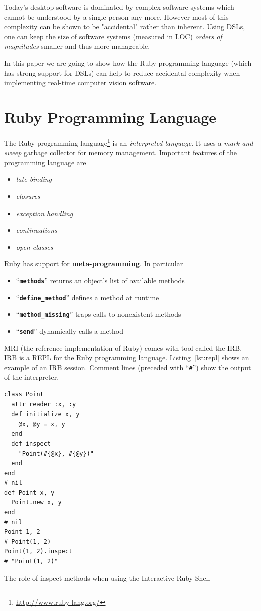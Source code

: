\documentclass[10pt,journal,compsoc]{joser1}
\newcommand{\code}[1]{``\texttt{\textbf{\textcolor{codegray}{\small{#1}}}}''}
\newcommand{\lst}[1]{Listing~\ref{lst:#1}}
\begin{document}
Today's desktop software is dominated by complex software systems which cannot
be understood by a single person any more. However most of this complexity can
be shown to be "accidental" rather than inherent\citep{ohshima2013kscript}.
Using \acp{DSL}, one can keep the size of software systems (measured in LOC)
\emph{orders of magnitudes} smaller and thus more
manageable\citep{kay2010steps}.

In this paper we are going to show how the Ruby programming language (which has
strong support for DSLs) can help to reduce accidental complexity when
implementing real-time computer vision software.

\section{Ruby Programming Language}
The Ruby programming language\footnote{\url{http://www.ruby-lang.org/}} is an
\emph{interpreted language}. It uses a \emph{mark-and-sweep} garbage collector
for memory management. Important features of the programming language are
\begin{itemize}
  \item \emph{late binding}
  \item \emph{closures}
  \item \emph{exception handling}
  \item \emph{continuations}
  \item \emph{open classes}
\end{itemize}

Ruby has support for \textbf{meta-programming}. In particular
\begin{itemize}
  \item \code{methods} returns an object's list of available methods
  \item \code{define\_method} defines a method at runtime
  \item \code{method\_missing} traps calls to nonexistent methods
  \item \code{send} dynamically calls a method
\end{itemize}

\ac{MRI} (the reference implementation of Ruby) comes with tool called the
\ac{IRB}. \ac{IRB} is a \ac{REPL} for the Ruby programming language. \lst{repl}
shows an example of an \ac{IRB} session. Comment lines (preceded with \code{\#}) show the output of the interpreter.
\begin{listing}[htbp]
  \begin{verbatim}
class Point
  attr_reader :x, :y
  def initialize x, y
    @x, @y = x, y
  end
  def inspect
    "Point(#{@x}, #{@y})"
  end
end
# nil
def Point x, y
  Point.new x, y
end
# nil
Point 1, 2
# Point(1, 2)
Point(1, 2).inspect
# "Point(1, 2)"
  \end{verbatim}
  \caption{The role of inspect methods when using the Interactive Ruby
  Shell\label{lst:repl}}
\end{listing}
\end{document}
